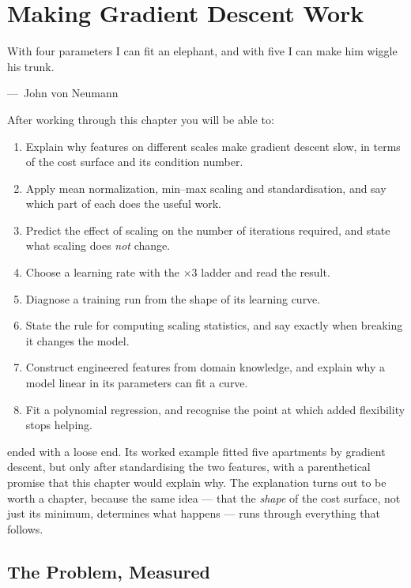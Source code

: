 
\chapter{Making Gradient Descent Work}
\label{ch:ch05}

\epigraph{With four parameters I can fit an elephant, and with five I can make
him wiggle his trunk.}{---\ John von Neumann}

\begin{chapterlearning}
After working through this chapter you will be able to:
\begin{enumerate}
  \item Explain why features on different scales make gradient descent slow, in
        terms of the cost surface and its condition number.
  \item Apply mean normalization, min--max scaling and standardisation, and say
        which part of each does the useful work.
  \item Predict the effect of scaling on the number of iterations required, and
        state what scaling does \emph{not} change.
  \item Choose a learning rate with the $\times 3$ ladder and read the result.
  \item Diagnose a training run from the shape of its learning curve.
  \item State the rule for computing scaling statistics, and say exactly when
        breaking it changes the model.
  \item Construct engineered features from domain knowledge, and explain why a
        model linear in its parameters can fit a curve.
  \item Fit a polynomial regression, and recognise the point at which added
        flexibility stops helping.
\end{enumerate}
\end{chapterlearning}

 ended with a loose end. Its worked example fitted five apartments
by gradient descent, but only after standardising the two features, with a
parenthetical promise that this chapter would explain why. The explanation turns
out to be worth a chapter, because the same idea --- that the \emph{shape} of the
cost surface, not just its minimum, determines what happens --- runs through
everything that follows.

\section{The Problem, Measured}
\label{sec:scaling-problem}

